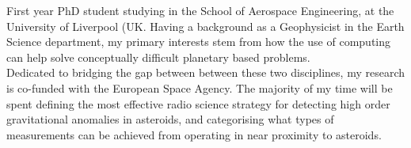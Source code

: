 
\begin{cvparagraph}


 First year PhD student studying in the School of Aerospace Engineering, at the University of Liverpool (UK. Having a background as a Geophysicist in the Earth Science department, my primary interests stem from how the use of computing can help solve conceptually difficult planetary based problems. \\
Dedicated to bridging the gap between between these two disciplines, my research is co-funded with the European Space Agency. The majority of my time will be spent defining the most effective radio science strategy for detecting high order gravitational anomalies in asteroids, and categorising what types of measurements can be achieved from \href{https://www.nasa.gov/what-are-smallsats-and-cubesats/#:~:text=What%20are%20CubeSats%3F,%2C%206%2C%20and%20even%2012U.}{\color{darkblue}{CubeSats}} operating in near proximity to asteroids.

\end{cvparagraph}